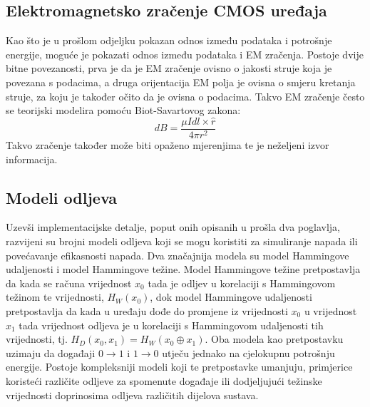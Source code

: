 \documentclass[times, utf8, diplomski]{fer}
\begin{document}
\subsection{Elektromagnetsko zračenje CMOS uređaja}
Kao što je u prošlom odjeljku pokazan odnos između podataka i potrošnje energije, moguće je pokazati odnos između podataka i EM zračenja. Postoje dvije bitne povezanosti, prva je da je EM zračenje ovisno o jakosti struje koja je povezana s podacima, a druga orijentacija EM polja je ovisna o smjeru kretanja struje, za koju je također očito da je ovisna o podacima. Takvo EM zračenje često se teorijski modelira pomoću Biot-Savartovog zakona:
\begin{equation}
    dB = \frac{\mu I dl \times \hat{r}}{4 \pi r^2}
\end{equation}
Takvo zračenje također može biti opaženo mjerenjima te je neželjeni izvor informacija.

\subsection{Modeli odljeva}

Uzevši implementacijske detalje, poput onih opisanih u prošla dva poglavlja, razvijeni su brojni modeli odljeva koji se mogu koristiti za simuliranje napada ili povećavanje efikasnosti napada. Dva značajnija modela su model Hammingove udaljenosti i model Hammingove težine. Model Hammingove težine pretpostavlja da kada se računa vrijednost \(x_0\) tada je odljev u korelaciji s Hammingovom težinom te vrijednosti, \(H_W(x_0)\), dok model Hammingove udaljenosti pretpostavlja da kada u uređaju dođe do promjene iz vrijednosti \(x_0\) u vrijednost \(x_1\) tada vrijednost odljeva je u korelaciji s Hammingovom udaljenosti tih vrijednosti, tj. \(H_D(x_0, x_1) = H_W(x_0 \oplus x_1)\). Oba modela kao pretpostavku uzimaju da događaji \(0 \rightarrow 1\) i \(1 \rightarrow 0\) utječu jednako na cjelokupnu potrošnju energije. Postoje kompleksniji modeli koji te pretpostavke umanjuju, primjerice koristeći različite odljeve za spomenute događaje ili dodjeljujući težinske vrijednosti doprinosima odljeva različitih dijelova sustava.
\end{document}
